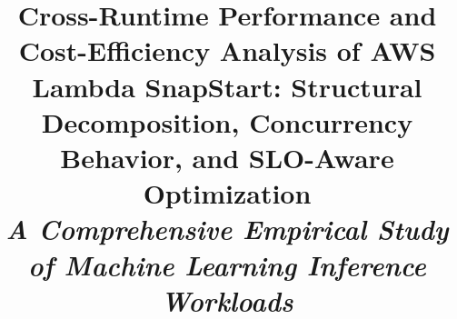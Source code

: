\documentclass[conference]{IEEEtran}
\begin{document}
\title{Cross-Runtime Performance and Cost-Efficiency Analysis of AWS Lambda SnapStart: Structural Decomposition, Concurrency Behavior, and SLO-Aware Optimization \\
{\footnotesize \textnormal{\textit{A Comprehensive Empirical Study of Machine Learning Inference Workloads}}}
}

\author{
\and
{}
}

\maketitle
\end{document}
